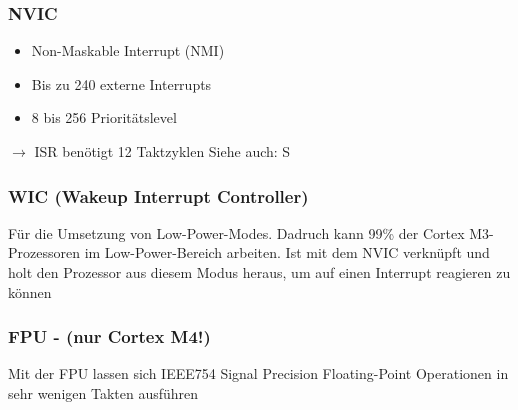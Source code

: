 \begin{multicols}{2}
    \begin{minipage}{\linewidth}
        \subsubsection{NVIC}
        \begin{itemize}
            \item Non-Maskable Interrupt (NMI)
            \item Bis zu 240 externe Interrupts
            \item 8 bis 256 Prioritätslevel
        \end{itemize}
        $\rightarrow$ ISR benötigt 12 Taktzyklen\newline
        Siehe auch: S\pageref{NVIC}\\
    \end{minipage}

    \begin{minipage}{\linewidth}
        \subsubsection{WIC (Wakeup Interrupt Controller)}
        Für die Umsetzung von Low-Power-Modes.\newline
        Dadruch kann 99\% der Cortex M3-Prozessoren im Low-Power-Bereich arbeiten.
        \newline
        \newline
        Ist mit dem NVIC verknüpft und holt den Prozessor aus diesem Modus heraus, um auf einen Interrupt reagieren zu können\\
    \end{minipage}
    
    \begin{minipage}{\linewidth}
        \subsubsection{FPU - (nur Cortex M4!)}
        Mit der FPU lassen sich IEEE754 Signal Precision Floating-Point Operationen in sehr wenigen Takten ausführen\\
    \end{minipage}
    
    \begin{minipage}{\linewidth}

\end{minipage}
\end{multicols}
